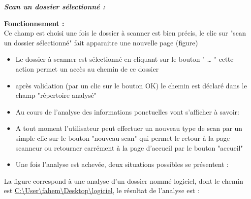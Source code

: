 \textit{\textbf{Scan un dossier sélectionné : }}
\begin{list}{•}{}
\item \textbf{Fonctionnement : }\\
Ce champ est choisi une fois le dossier à scanner est bien précis, le clic sur "scan un dossier sélectionné"  fait apparaitre une nouvelle page (figure)\\
\begin{itemize}
\item Le dossier à scanner est sélectionné en cliquant sur le bouton " … " cette action permet un accès au chemin de ce dossier 
\item après validation (par un clic sur le bouton OK) le chemin est déclaré dans le champ "répertoire analysé"
\item Au cours de l'analyse des informations ponctuelles vont s'afficher à savoir:

\item A  tout moment l'utilisateur peut effectuer un nouveau type de scan par un simple clic sur le bouton "nouveau scan" qui permet le retour à la page scanneur ou retourner carrément à la page d'accueil  par le bouton "accueil" 
\item Une fois l'analyse est achevée, deux situations possibles se présentent :
\end{itemize}
La figure correspond à une analyse d'un dossier nommé logiciel, dont le chemin est \url{C:\User\fahem\Desktop\logiciel}, le résultat de l'analyse est :\\


\end{list}
